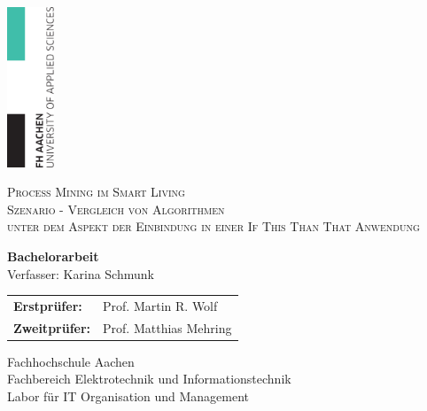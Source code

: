 \begin{titlepage}
\begin{center}
\hfill
\includegraphics[width = 14mm]{figures/Appbildungen/FHAachen-logo.png}
\newcommand{\HorizontalLine}{\rule{\linewidth}{0.3mm}}
\begin{spacing}{2.5}
    \textsc{\Large  Process Mining im Smart Living} \\
    \textsc{\Large  Szenario - Vergleich von Algorithmen} \\
    \textsc{\Large   unter dem Aspekt der Einbindung in einer If This Than That Anwendung}\\
\end{spacing}
\vspace{20mm}

{\Large \bfseries Bachelorarbeit}\\[1.1cm]
{\Large Verfasser: Karina Schmunk} \\[1.2cm]

\begin{tabular}[hc]{>{\large}l >{\large}l}
  \bfseries Erstprüfer: & Prof. Martin R. Wolf \\[0.3cm]
  \bfseries Zweitprüfer: & Prof. Matthias Mehring \\[1.2cm]
\end{tabular}
\vfill  %

\Large {
    Fachhochschule Aachen\\
    Fachbereich Elektrotechnik und Informationstechnik\\
    Labor für IT Organisation und Management\\[1cm]

    
}
\end{center}
\end{titlepage}
